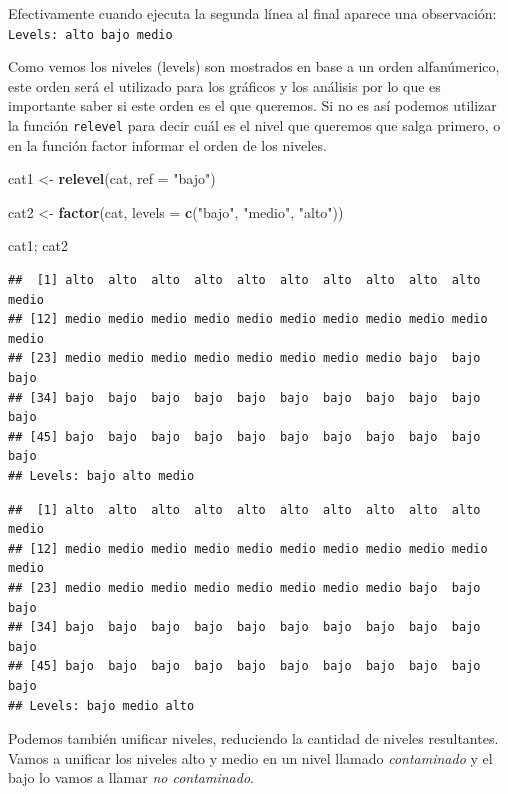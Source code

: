 \documentclass[]{article}
\newenvironment{Shaded}{\begin{snugshade}}{\end{snugshade}}
\newcommand{\KeywordTok}[1]{\textcolor[rgb]{0.13,0.29,0.53}{\textbf{{#1}}}}
\newcommand{\DataTypeTok}[1]{\textcolor[rgb]{0.13,0.29,0.53}{{#1}}}
\newcommand{\StringTok}[1]{\textcolor[rgb]{0.31,0.60,0.02}{{#1}}}
\newcommand{\NormalTok}[1]{{#1}}
\begin{document}
Efectivamente cuando ejecuta la segunda línea al final aparece una
observación: \texttt{Levels:\ alto\ bajo\ medio}

Como vemos los niveles (levels) son mostrados en base a un orden
alfanúmerico, este orden será el utilizado para los gráficos y los
análisis por lo que es importante saber si este orden es el que
queremos. Si no es así podemos utilizar la función \texttt{relevel} para
decir cuál es el nivel que queremos que salga primero, o en la función
factor informar el orden de los niveles.

\begin{Shaded}
\begin{Highlighting}[]
\NormalTok{cat1 <-}\StringTok{ }\KeywordTok{relevel}\NormalTok{(cat, }\DataTypeTok{ref =} \StringTok{"bajo"}\NormalTok{)}

\NormalTok{cat2 <-}\StringTok{ }\KeywordTok{factor}\NormalTok{(cat, }\DataTypeTok{levels =} \KeywordTok{c}\NormalTok{(}\StringTok{"bajo"}\NormalTok{, }\StringTok{"medio"}\NormalTok{, }\StringTok{"alto"}\NormalTok{))}

\NormalTok{cat1; cat2}
\end{Highlighting}
\end{Shaded}

\begin{verbatim}
##  [1] alto  alto  alto  alto  alto  alto  alto  alto  alto  alto  medio
## [12] medio medio medio medio medio medio medio medio medio medio medio
## [23] medio medio medio medio medio medio medio medio bajo  bajo  bajo 
## [34] bajo  bajo  bajo  bajo  bajo  bajo  bajo  bajo  bajo  bajo  bajo 
## [45] bajo  bajo  bajo  bajo  bajo  bajo  bajo  bajo  bajo  bajo  bajo 
## Levels: bajo alto medio
\end{verbatim}

\begin{verbatim}
##  [1] alto  alto  alto  alto  alto  alto  alto  alto  alto  alto  medio
## [12] medio medio medio medio medio medio medio medio medio medio medio
## [23] medio medio medio medio medio medio medio medio bajo  bajo  bajo 
## [34] bajo  bajo  bajo  bajo  bajo  bajo  bajo  bajo  bajo  bajo  bajo 
## [45] bajo  bajo  bajo  bajo  bajo  bajo  bajo  bajo  bajo  bajo  bajo 
## Levels: bajo medio alto
\end{verbatim}

Podemos también unificar niveles, reduciendo la cantidad de niveles
resultantes. Vamos a unificar los niveles alto y medio en un nivel
llamado \emph{contaminado} y el bajo lo vamos a llamar \emph{no
contaminado}.
\end{document}

